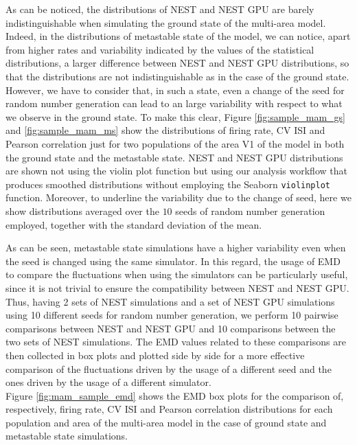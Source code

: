 \documentclass[a4paper, 12pt, twoside, openright]{book}
\begin{document}
As can be noticed, the distributions of NEST and NEST GPU are barely indistinguishable when simulating the ground state of the multi-area model.\\
Indeed, in the distributions of metastable state of the model, we can notice, apart from higher rates and variability indicated by the values of the statistical distributions, a larger difference between NEST and NEST GPU distributions, so that the distributions are not indistinguishable as in the case of the ground state. However, we have to consider that, in such a state, even a change of the seed for random number generation can lead to an large variability with respect to what we observe in the ground state. To make this clear, Figure \ref{fig:sample_mam_gs} and \ref{fig:sample_mam_ms} show the distributions of firing rate, CV ISI and Pearson correlation just for two populations of the area V1 of the model in both the ground state and the metastable state. NEST and NEST GPU distributions are shown not using the violin plot function but using our analysis workflow that produces smoothed distributions without employing the Seaborn \texttt{violinplot} function. Moreover, to underline the variability due to the change of seed, here we show distributions averaged over the $10$ seeds of random number generation employed, together with the standard deviation of the mean.


As can be seen, metastable state simulations have a higher variability even when the seed is changed using the same simulator. In this regard, the usage of EMD to compare the fluctuations when using the simulators can be particularly useful, since it is not trivial to ensure the compatibility between NEST and NEST GPU. Thus, having 2 sets of NEST simulations and a set of NEST GPU simulations using 10 different seeds for random number generation, we perform 10 pairwise comparisons between NEST and NEST GPU and 10 comparisons between the two sets of NEST simulations. The EMD values related to these comparisons are then collected in box plots and plotted side by side for a more effective comparison of the fluctuations driven by the usage of a different seed and the ones driven by the usage of a different simulator.\\
Figure \ref{fig:mam_sample_emd} shows the EMD box plots for the comparison of, respectively, firing rate, CV ISI and Pearson correlation distributions for each population and area of the multi-area model in the case of ground state and metastable state simulations.
\end{document}
